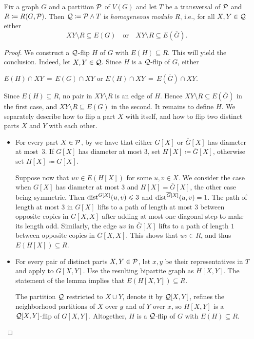\begin{lemma}\label{lem:default}
    Fix a graph $G$ and a partition $\mathcal P$ of $V(G)$ and let $T$ be a transversal of $\mathcal P$ and $R \coloneqq R(G,\mathcal P)$.
    Then $\mathcal Q \coloneqq \mathcal P \wedge T$ is \emph{homogeneous modulo $R$}, i.e., for all $X,Y \in \mathcal Q$ either
    \[
        XY \setminus R \subseteq E(G)
        \quad
        \text{or}
        \quad
        XY \setminus R \subseteq E(\overline{G}).
    \]
\end{lemma}

\begin{proof}
    We construct a $\mathcal Q$-flip $H$ of $G$ with $E(H)\subseteq R$. This will yield the conclusion.
    Indeed, let $X,Y\in\mathcal Q$. Since $H$ is a $\mathcal Q$-flip of $G$, either
    \begin{center}
    $E(H)\cap XY \,=\, E(G)\cap XY$ \quad or \quad  $E(H)\cap XY \,=\, E(\overline G)\cap XY$.    
    \end{center}
    Since $E(H)\subseteq R$, no pair in $XY\setminus R$ is an edge of $H$.
    Hence $XY\setminus R\subseteq E(\overline G)$ in the first case, and
    $XY\setminus R\subseteq E(G)$ in the second.
    It remains to define $H$. We separately describe how to flip a part $X$ with itself, and how to flip two distinct parts $X$ and $Y$ with each other.

    \begin{itemize}
        \item     For every part $X\in\mathcal P$, by  we have that 
    either $G[X]$ or $\overline{G}[X]$ has diameter at most~$3$.
    If $G[X]$ has diameter at most $3$, set 
 $H[X]\coloneqq \overline G[X]$, otherwise set $H[X]\coloneqq G[X]$.

 Suppose now that $uv\in E(H[X])$ for some $u,v\in X$. 
 We consider the case when $G[X]$ has diameter at most $3$ and 
  $H[X] = \overline G[X]$, the other case being symmetric. 
Then $\mathrm{dist}^{G[X]}(u,v)\leqslant 3$ and $\mathrm{dist}^{\overline G[X]}(u,v)= 1$.
The path of length at most $3$ in $G[X]$ lifts to a path of length at most $3$ between opposite copies in $G[X,X]$ after adding at most one diagonal step to make its length odd.
Similarly, the edge $uv$ in $\overline G[X]$ lifts to a path of length $1$ between opposite copies in $\overline G[X,X]$. This shows that $uv\in R$, and thus $E(H[X])\subseteq R$.

\item
For every pair of distinct parts $X,Y\in\mathcal P$, let $x,y$ be their representatives in $T$ and apply  to $G[X,Y]$.
    Use the resulting bipartite graph as $H[X,Y]$. The statement of the lemma implies that $E(H[X,Y])\subseteq R$.

    The partition $\mathcal Q$ restricted to $X\cup Y$, denote it by $\mathcal Q[X,Y]$, refines the neighborhood partitions of $X$ over $y$ and of $Y$ over $x$, so $H[X,Y]$ is a $\mathcal Q[X,Y]$-flip of $G[X,Y]$.
    Altogether, $H$ is a     
    $\mathcal Q$-flip of $G$ with $E(H)\subseteq R$.\qedhere
    \end{itemize}
\end{proof}




